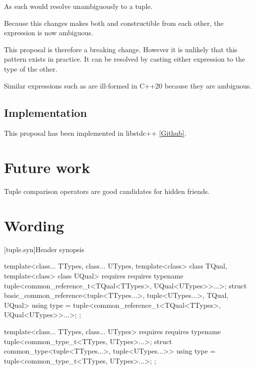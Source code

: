 \documentclass{wg21}
\begin{document}
As such  would resolve unambiguously to a tuple.

Because this changes makes both  and  constructible from each other,
the expression is now ambiguous.

This proposal is therefore a breaking change.
However it is unlikely that this pattern exists in practice.
It can be resolved by casting either expression to the type of the other.

Similar expressions such as  are ill-formed in C++20 because they are ambiguous.


\subsection{Implementation}

This proposal has been implemented in libstdc++ \href{https://github.com/cor3ntin/gcc/tree/tuple_pair2}{[Github]}.

\section{Future work}

Tuple comparison operators are good candidates for hidden friends.

\section{Wording}


[tuple.syn]{Header  synopsis}
\begin{codeblock}
#include <compare>              // see \ref{compare.syn}

namespace std {
// \ref{tuple.tuple}, class template 
template<class... Types>
class tuple;

\end{codeblock}
\begin{removedblock}
\begin{codeblock}
template<class... TTypes, class... UTypes, template<class> class TQual,
template<class> class UQual>
requires requires { typename tuple<common_reference_t<TQual<TTypes>, UQual<UTypes>>...>; }
struct basic_common_reference<tuple<TTypes...>, tuple<UTypes...>, TQual, UQual> {
    using type = tuple<common_reference_t<TQual<TTypes>, UQual<UTypes>>...>;
};

template<class... TTypes, class... UTypes>
requires requires { typename tuple<common_type_t<TTypes, UTypes>...>; }
struct common_type<tuple<TTypes...>, tuple<UTypes...>> {
    using type = tuple<common_type_t<TTypes, UTypes>...>;
};
\end{codeblock}
\end{removedblock}
\end{document}
